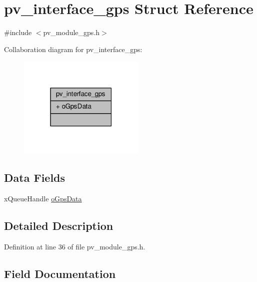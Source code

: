 \hypertarget{structpv__interface__gps}{}\section{pv\+\_\+interface\+\_\+gps Struct Reference}
\label{structpv__interface__gps}


{\ttfamily \#include $<$pv\+\_\+module\+\_\+gps.\+h$>$}



Collaboration diagram for pv\+\_\+interface\+\_\+gps\+:\nopagebreak
\begin{figure}[H]
\begin{center}
\leavevmode
\includegraphics[width=171pt]{structpv__interface__gps__coll__graph}
\end{center}
\end{figure}
\subsection*{Data Fields}
\begin{DoxyCompactItemize}
\item 
x\+Queue\+Handle \hyperlink{structpv__interface__gps_a4e4f88e8b52f49bd7ceae60e2660f406}{o\+Gps\+Data}
\end{DoxyCompactItemize}


\subsection{Detailed Description}


Definition at line 36 of file pv\+\_\+module\+\_\+gps.\+h.



\subsection{Field Documentation}
